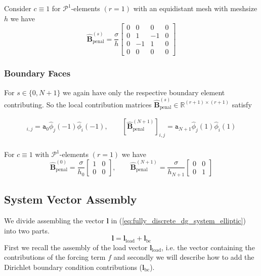 \begin{example}
	Consider $c\equiv 1$ for $\mathcal{P}^1$-elements $(r=1)$
	with an equidistant mesh with meshsize $h$ we have
	\begin{equation*}
		\widehat{\textbf{B}}_{\text{penal}}^{(s)} = \frac{\sigma}{h}
		\begin{bmatrix}
			0 & 0  & 0  & 0 \\
			0 & 1  & -1 & 0 \\
			0 & -1 & 1  & 0 \\
			0 & 0  & 0  & 0
		\end{bmatrix}
	\end{equation*}
\end{example}

\subsubsection{Boundary Faces}
For $s \in  \{0, N+1\} $ we again have only the respective boundary element contributing.
So the local contribution matrices $ \widehat{\textbf{B}}_{\text{penal}}^{(s)} \in \mathbb{R}^{(r+1) \times (r+1)} $ satisfy

\begin{align*}
	[\widehat{\textbf{B}}_{\text{penal}}^{(0)}]_{i,j} =
	\texttt{a}_0 \widehat{\phi}_j(-1) \widehat{\phi}_i(-1), \qquad
	[\widehat{\textbf{B}}_{\text{penal}}^{(N+1)}]_{i,j} =
	\texttt{a}_{N+1} \widehat{\phi}_j(1) \widehat{\phi}_i(1) \\
\end{align*}

\begin{example}
	For $c\equiv 1$ with $\mathcal{P}^1$-elements $(r=1)$ we have
	\begin{equation*}
		\widehat{\textbf{B}}_{\text{penal}}^{(0)} = \frac{\sigma}{h_0}
		\begin{bmatrix}
			1 & 0 \\
			0 & 0
		\end{bmatrix}
		,\qquad
		\widehat{\textbf{B}}_{\text{penal}}^{(N+1)} = \frac{\sigma}{h_{N+1}}
		\begin{bmatrix}
			0 & 0 \\
			0 & 1
		\end{bmatrix}
	\end{equation*}
\end{example}

\subsection{System Vector Assembly}
We divide assembling the vector \textbf{l} in (\ref{eq:fully_discrete_dg_system_elliptic}) into two parts.
\begin{equation*}
	\textbf{l} = \textbf{l}_{\text{load}} + \textbf{l}_{\text{bc}}
\end{equation*}
First we recall the assembly of the load vector $\textbf{l}_{\text{load}}$, i.e. the vector containing the contributions of the forcing term $f$
and secondly we will describe how to add the Dirichlet boundary condition contributions ($\textbf{l}_{\text{bc}}$).
